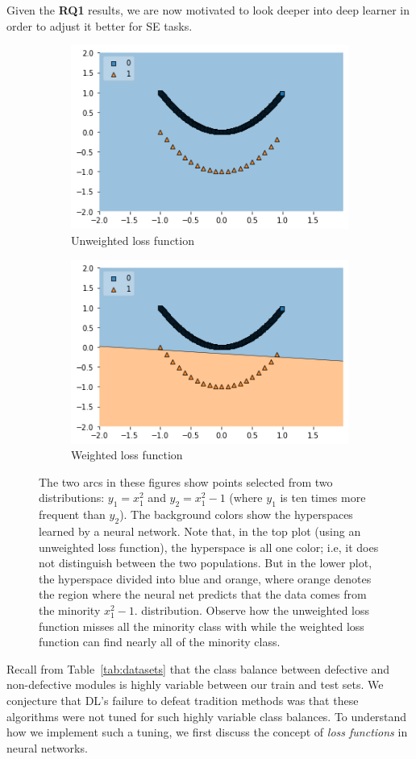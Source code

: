 \documentclass[10pt,compsoc,twocolumn]{IEEEtran}
\begin{document}
Given the  {\bf RQ1} results, we are now motivated to look deeper into deep learner in order to adjust it better for SE tasks. 
\begin{figure}[!t]
\centering
    \begin{subfigure}[b]{.4\textwidth}
        \centering
        \includegraphics[width=.7\textwidth]{unweighted.png}
        \caption{Unweighted loss function}
        \label{fig:unweighted}
    \end{subfigure}
    \begin{subfigure}[b]{.4\textwidth}
        \centering
        \includegraphics[width=.7\textwidth]{weighted.png}
        \caption{Weighted loss function}
        \label{fig:weighted}
    \end{subfigure}
    \caption{The two arcs in these figures show points selected from two distributions: $y_1=x_1^2$ and $y_2=x_1^2-1$ (where $y_1$ is ten times more frequent than $y_2$).  The background colors show the hyperspaces learned by a neural network. Note that, in the top plot (using an unweighted loss function), the hyperspace is all one color; i.e, it does not distinguish between the two populations. But in the lower plot, the hyperspace divided into blue and orange, where orange denotes the region where the neural net predicts that the data comes from the minority  $x_1^2-1$. distribution. Observe how  the unweighted loss function misses all the minority class with  while the  weighted loss function can find nearly all  of the minority class.}
\end{figure}
Recall from Table~\ref{tab:datasets} that the class balance    between defective and non-defective modules is highly variable between our train and test sets.
We conjecture that DL's failure to defeat tradition methods was that these algorithms were not
tuned for such highly variable class balances. 
To understand how we implement such a tuning, we first discuss the concept of {\em loss functions} in neural networks.
\end{document}
